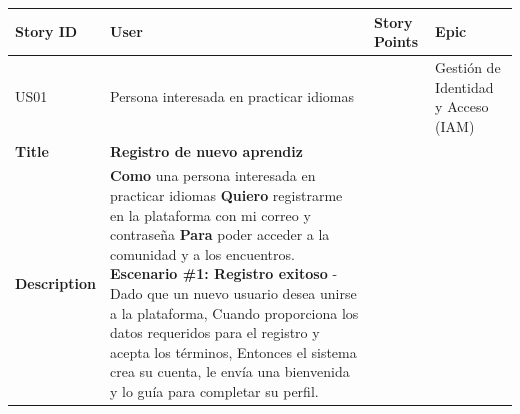 {\def\LTcaptype{none} %
\begin{longtable}[]{@{}
  >{\raggedright\arraybackslash}p{}
  >{\raggedright\arraybackslash}p{}
  >{\raggedright\arraybackslash}p{}
  >{\raggedright\arraybackslash}p{}@{}}
\toprule\noalign{}
\begin{minipage}[b]{\linewidth}\raggedright
Story ID
\end{minipage} & \begin{minipage}[b]{\linewidth}\raggedright
User
\end{minipage} & \begin{minipage}[b]{\linewidth}\raggedright
Story Points
\end{minipage} & \begin{minipage}[b]{\linewidth}\raggedright
Epic
\end{minipage} \\
\midrule\noalign{}
\endhead
\bottomrule\noalign{}
\endlastfoot
US01 & Persona interesada en practicar idiomas & 3 & Gestión de
Identidad y Acceso (IAM) \\
\textbf{Title} & \textbf{Registro de nuevo aprendiz} & & \\
\textbf{Description} & \textbf{Como} una persona interesada en practicar
idiomas \textbf{Quiero} registrarme en la plataforma con mi correo y
contraseña \textbf{Para} poder acceder a la comunidad y a los
encuentros. \textbf{Escenario \#1: Registro exitoso} - Dado que un nuevo
usuario desea unirse a la plataforma, Cuando proporciona los datos
requeridos para el registro y acepta los términos, Entonces el sistema
crea su cuenta, le envía una bienvenida y lo guía para completar su
perfil. & & \\
\end{longtable}
}

